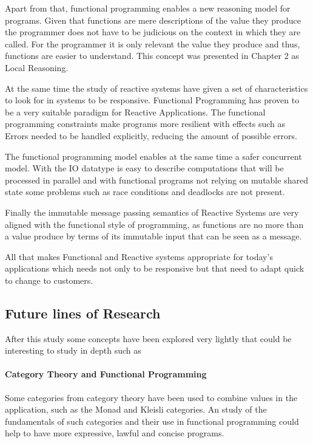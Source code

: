 \documentclass[../main.tex]{subfiles}
\begin{document}
Apart from that, functional programming enables a new reasoning model for
programs. Given that functions are mere descriptions of the value they produce
the programmer does not have to be judicious on the context in which they are
called. For the programmer it is only relevant the value they produce and thus,
functions are easier to understand. This concept was presented in Chapter 2 as
Local Reasoning.

At the same time the study of reactive systems have given a set of
characteristics to look for in systems to be responsive. Functional Programming
has proven to be a very suitable paradigm for Reactive Applications. The
functional programming constraints make programs more resilient with effects
such as Errors needed to be handled explicitly, reducing the amount of possible
errors.

The functional programming model enables at the same time a safer concurrent
model. With the IO datatype is easy to describe computations that will be
processed in parallel and with functional programs not relying on mutable shared
state some problems such as race conditions and deadlocks are not present.

Finally the immutable message passing semantics of Reactive Systems are very
aligned with the functional style of programming, as functions are no more than
a value produce by terms of its immutable input that can be seen as a message.

All that makes Functional and Reactive systems appropriate for today's
applications which needs not only to be responsive but that need to adapt quick
to change to customers.

\subsection{Future lines of Research}
After this study some concepts have been explored very lightly that could be
interesting to study in depth such as

\paragraph{Category Theory and Functional Programming}

Some categories from category theory have been used to combine values in the
application, such as the Monad and Kleisli categories. An study of the
fundamentals of such categories and their use in functional programming could
help to have more expressive, lawful and concise programs.
\end{document}
